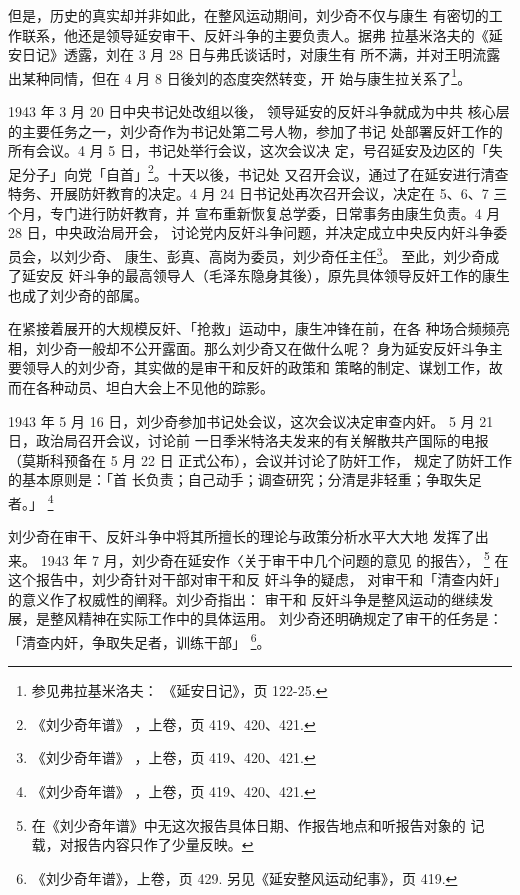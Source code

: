 但是，历史的真实却并非如此，在整风运动期间，刘少奇不仅与康生
有密切的工作联系，他还是领导延安审干、反奸斗争的主要负责人。据弗
拉基米洛夫的《延安日记》透露，刘在 3 月 28 日与弗氏谈话时，对康生有
所不满，并对王明流露出某种同情，但在 4 月 8 日後刘的态度突然转变，开
始与康生拉关系了\footnote{参见弗拉基米洛夫：
《延安日记》，页 122-25.}。

1943 年 3 月 20 日中央书记处改组以後，
领导延安的反奸斗争就成为中共
核心层的主要任务之一，刘少奇作为书记处第二号人物，参加了书记
处部署反奸工作的所有会议。4 月 5 日，书记处举行会议，这次会议决
定，号召延安及边区的「失足分子」向党「自首」\footnote{《刘少奇年谱》
，上卷，页 419、420、421.}。十天以後，书记处
又召开会议，通过了在延安进行清查特务、开展防奸教育的决定。4 月 24
日书记处再次召开会议，决定在 5、6、7 三个月，专门进行防奸教育，并
宣布重新恢复总学委，日常事务由康生负责。4 月 28 日，中央政治局开会，
讨论党内反奸斗争问题，并决定成立中央反内奸斗争委员会，以刘少奇、
康生、彭真、高岗为委员，刘少奇任主任\footnote{《刘少奇年谱》
，上卷，页 419、420、421.}。
至此，刘少奇成了延安反
奸斗争的最高领导人（毛泽东隐身其後），原先具体领导反奸工作的康生
也成了刘少奇的部属。

在紧接着展开的大规模反奸、「抢救」运动中，康生冲锋在前，在各
种场合频频亮相，刘少奇一般却不公开露面。那么刘少奇又在做什么呢？
身为延安反奸斗争主要领导人的刘少奇，其实做的是审干和反奸的政策和
策略的制定、谋划工作，故而在各种动员、坦白大会上不见他的踪影。

1943 年 5 月 16 日，刘少奇参加书记处会议，这次会议决定审查内奸。
5 月 21 日，政治局召开会议，讨论前
一日季米特洛夫发来的有关解散共产国际的电报（莫斯科预备在 5 月 22 日
正式公布），会议并讨论了防奸工作，
规定了防奸工作的基本原则是：「首
长负责；自己动手；调查研究；分清是非轻重；争取失足者。」
\footnote{《刘少奇年谱》
，上卷，页 419、420、421.}

刘少奇在审干、反奸斗争中将其所擅长的理论与政策分析水平大大地 发挥了出来。
1943 年 7 月，刘少奇在延安作〈关于审干中几个问题的意见 的报告〉，
\footnote{在《刘少奇年谱》中无这次报告具体日期、作报告地点和听报告对象的
记载，对报告内容只作了少量反映。} 在这个报告中，刘少奇针对干部对审干和反
奸斗争的疑虑， 对审干和「清查内奸」的意义作了权威性的阐释。刘少奇指出：
审干和 反奸斗争是整风运动的继续发展，是整风精神在实际工作中的具体运用。
刘少奇还明确规定了审干的任务是： 「清查内奸，争取失足者，训练干部」
\footnote{《刘少奇年谱》，上卷，页 429. 另见《延安整风运动纪事》，页
419.  }。

